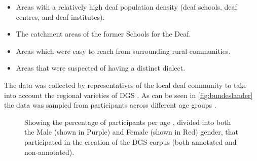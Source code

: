 \begin{itemize}
  \item Areas with a relatively high deaf population density (deaf schools, deaf centres, and deaf institutes). \cite{age_data_hamburg} \cite{deaf_areas}
  \item The catchment areas of the former Schools for the Deaf.\cite{age_data_hamburg} \cite{prillwitz2008dgs}
  \item Areas which were easy to reach from surrounding rural communities. \cite{age_data_hamburg} \cite{deaf_areas}
  \item Areas that were suspected of having a distinct dialect. \cite{age_data_hamburg} \cite{prillwitz2008dgs}
\end{itemize}

 The data was collected by representatives of the local deaf community to take into account the regional varieties of DGS \cite{deaf_areas}. As can be seen in \autoref{fig:bundeslander} the data was sampled from participants across different age groups \cite{age_data_hamburg}. 


\mydata

\begin{figure}[h]
\caption{Showing the percentage of participants per age , divided into both the Male (shown in Purple) and Female (shown in Red) gender,  that participated in the creation of the DGS corpus (both annotated and non-annotated). \cite{age_data_hamburg}}
\label{fig:bundeslander}
\end{figure}

